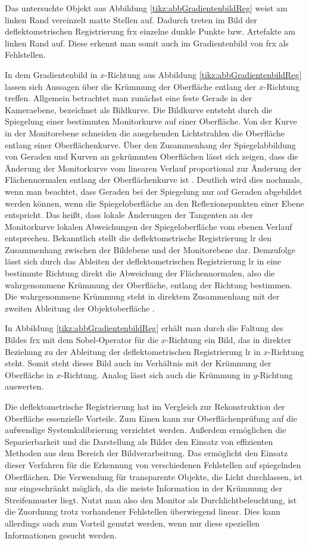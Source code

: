 \noindent
Das untersuchte Objekt aus Abbildung \ref{tikz:abbGradientenbildReg} weist am linken Rand vereinzelt matte Stellen auf.
Dadurch treten im Bild der deflektometrischen Registrierung \acrshort{frx} einzelne dunkle Punkte bzw. Artefakte am linken Rand auf.
Diese erkennt man somit auch im Gradientenbild von \acrshort{frx} als Fehlstellen.

\p
In dem Gradientenbild in $x$-Richtung aus Abbildung \ref{tikz:abbGradientenbildReg} lassen sich Aussagen über die Krümmung der Oberfläche entlang der $x$-Richtung treffen.
Allgemein betrachtet man zu\-nächst eine feste Gerade in der Kameraebene, bezeichnet als Bildkurve.
Die Bildkurve entsteht durch die Spiegelung einer bestimmten Monitorkurve auf einer Oberfläche.
Von der Kurve in der Monitorebene schneiden die ausgehenden Lichtstrahlen die Oberfläche entlang einer Oberflächenkurve.
Über den Zusammenhang der Spiegelabbildung von Geraden und Kurven an gekrümmten Oberflächen lässt sich zeigen, dass die Änderung der Monitorkurve vom linearen Verlauf proportional zur Änderung der Flächennormalen entlang der Oberflächenkurve ist \cite{kit_werling}.
Deutlich wird dies nochmals, wenn man beachtet, dass Geraden bei der Spiegelung nur auf Geraden abgebildet werden können, wenn die Spiegeloberfläche an den Reflexionspunkten einer Ebene entspricht.
Das heißt, dass lokale Änderungen der Tangenten an der Monitorkurve lokalen Abweichungen der Spiegeloberfläche vom ebenen Verlauf entsprechen.
Bekanntlich stellt die deflektometrische Registrierung \acrshort{lr} den Zusammenhang zwischen der Bildebene und der Monitorebene dar.
Demzufolge lässt sich durch das Ableiten der deflektometrischen Registrierung \acrshort{lr} in eine bestimmte Richtung direkt die Abweichung der Flächennormalen, also die wahrgenommene Krümmung der Oberfläche, entlang der Richtung bestimmen.
Die wahrgenommene Krümmung steht in direktem Zusammenhang mit der zweiten Ableitung der Objektoberfläche \cite{kit_werling}.

\p
In Abbildung \ref{tikz:abbGradientenbildReg} erhält man durch die Faltung des Bildes \acrshort{frx} mit dem Sobel-Operator für die $x$-Richtung ein Bild, das in direkter Beziehung zu der Ableitung der deflektometrischen Registrierung \acrshort{lr} in  $x$-Richtung steht.
Somit steht dieses Bild auch im Verhältnis mit der Krümmung der Oberfläche in $x$-Richtung.
Analog lässt sich auch die Krümmung in $y$-Richtung auswerten.

\p
Die deflektometrische Registrierung hat im Vergleich zur Rekonstruktion der Oberfläche essenzielle Vorteile.
Zum Einen kann zur Oberflächenprüfung auf die aufwendige Systemkalibrierung verzichtet werden.
Außerdem ermöglichen die Separierbarkeit und die Darstellung als Bilder den Einsatz von effizienten Methoden aus dem Bereich der Bildverarbeitung.
Das ermöglicht den Einsatz dieser Verfahren für die Erkennung von verschiedenen Fehlstellen auf spiegelnden Oberflächen.
Die Verwendung für transparente Objekte, die Licht durchlassen, ist nur eingeschränkt möglich, da die meiste Information in der Krümmung der Streifenmuster liegt.
Nutzt man also den Monitor als Durchlichtbeleuchtung, ist die Zuordnung trotz vorhandener Fehlstellen überwiegend linear.
Dies kann allerdings auch zum Vorteil genutzt werden, wenn nur diese speziellen Informationen gesucht werden.